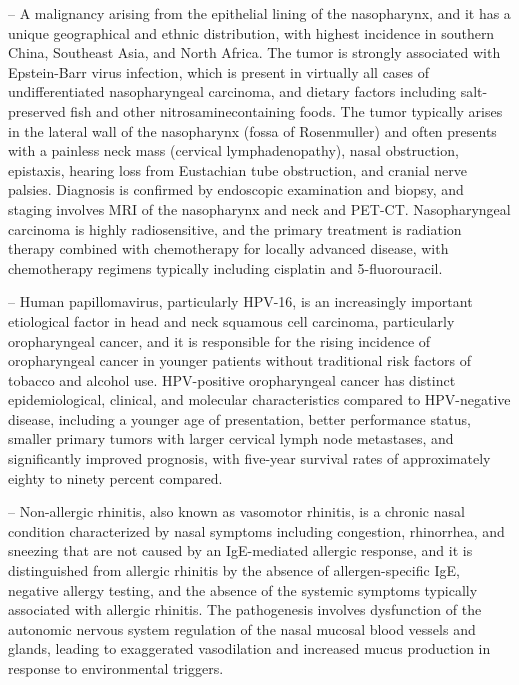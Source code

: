 -- A malignancy arising from the epithelial lining of the nasopharynx, and it has a unique geographical and ethnic distribution, with highest incidence in southern China, Southeast Asia, and North Africa. The tumor is strongly associated with Epstein-Barr virus infection, which is present in virtually all cases of undifferentiated nasopharyngeal carcinoma, and dietary factors including salt-preserved fish and other nitrosaminecontaining foods. The tumor typically arises in the lateral wall of the nasopharynx (fossa of Rosenmuller) and often presents with a painless neck mass (cervical lymphadenopathy), nasal obstruction, epistaxis, hearing loss from Eustachian tube obstruction, and cranial nerve palsies. Diagnosis is confirmed by endoscopic examination and biopsy, and staging involves MRI of the nasopharynx and neck and PET-CT. Nasopharyngeal carcinoma is highly radiosensitive, and the primary treatment is radiation therapy combined with chemotherapy for locally advanced disease, with chemotherapy regimens typically including cisplatin and 5-fluorouracil.

-- Human papillomavirus, particularly HPV-16, is an increasingly important etiological factor in head and neck squamous cell carcinoma, particularly oropharyngeal cancer, and it is responsible for the rising incidence of oropharyngeal cancer in younger patients without traditional risk factors of tobacco and alcohol use. HPV-positive oropharyngeal cancer has distinct epidemiological, clinical, and molecular characteristics compared to HPV-negative disease, including a younger age of presentation, better performance status, smaller primary tumors with larger cervical lymph node metastases, and significantly improved prognosis, with five-year survival rates of approximately eighty to ninety percent compared.

-- Non-allergic rhinitis, also known as vasomotor rhinitis, is a chronic nasal condition characterized by nasal symptoms including congestion, rhinorrhea, and sneezing that are not caused by an IgE-mediated allergic response, and it is distinguished from allergic rhinitis by the absence of allergen-specific IgE, negative allergy testing, and the absence of the systemic symptoms typically associated with allergic rhinitis. The pathogenesis involves dysfunction of the autonomic nervous system regulation of the nasal mucosal blood vessels and glands, leading to exaggerated vasodilation and increased mucus production in response to environmental triggers.

